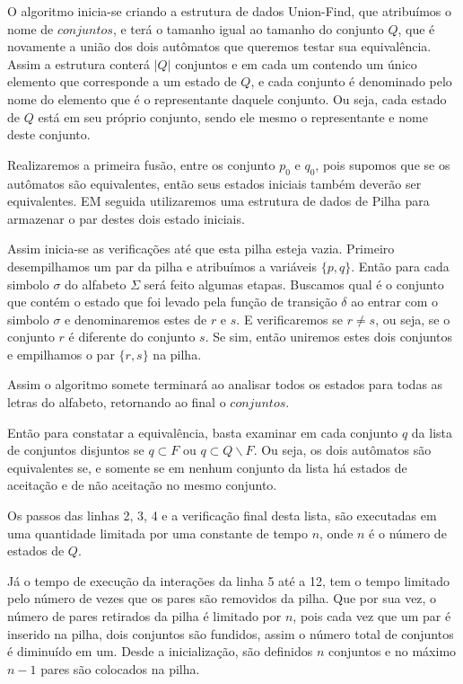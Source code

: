 \documentclass[
	12pt,				%
	openany,
	oneside,
	a4paper,			%
	english,			%
	brazil				%
	]{abntex2}
\begin{document}
  O algoritmo inicia-se criando a estrutura de dados Union-Find, que atribuímos o nome de $conjuntos$, e terá o tamanho igual ao tamanho do conjunto $Q$, que é novamente a união dos dois autômatos que queremos testar sua equivalência. Assim a estrutura conterá $|Q|$ conjuntos e em cada um contendo um único elemento que corresponde a um estado de $Q$, e cada conjunto é denominado pelo nome do elemento que é o representante daquele conjunto. Ou seja, cada estado de $Q$ está em seu próprio conjunto, sendo ele mesmo o representante e nome deste conjunto.

  Realizaremos a primeira fusão, entre os conjunto $p_0$ e $q_0$, pois supomos que se os autômatos são equivalentes, então seus estados iniciais também deverão ser equivalentes. EM seguida utilizaremos uma estrutura de dados de Pilha para armazenar o par destes dois estado iniciais.

  Assim inicia-se as verificações até que esta pilha esteja vazia. Primeiro desempilhamos um par da pilha e atribuímos a variáveis $\{p,q\}$. Então para cada simbolo $\sigma$ do alfabeto $\Sigma$ será feito algumas etapas. Buscamos qual é o conjunto que contém o estado que foi levado pela função de transição $\delta$ ao entrar com o simbolo $\sigma$ e denominaremos estes de $r$ e $s$. E verificaremos se $r \neq s$, ou seja, se o conjunto $r$ é diferente do conjunto $s$. Se sim, então uniremos estes dois conjuntos e empilhamos o par $\{r, s\}$ na pilha.

  Assim o algoritmo somete terminará ao analisar todos os estados para todas as letras do alfabeto, retornando ao final o $conjuntos$.

  Então para constatar a equivalência, basta examinar em cada conjunto $q$ da lista de conjuntos disjuntos se $q \subset F$ ou $q \subset Q \backslash F$. Ou seja, os dois autômatos são equivalentes se, e somente se em nenhum conjunto da lista há estados de aceitação e de não aceitação no mesmo conjunto.

  Os passos das linhas 2, 3, 4 e a verificação final desta lista, são executadas em uma quantidade limitada por uma constante de tempo $n$, onde $n$ é o número de estados de $Q$.

 Já o tempo de execução da interações da linha 5 até a 12, tem o tempo limitado pelo número de vezes que os pares são removidos da pilha. Que por sua vez, o número de pares retirados da pilha é limitado por $n$, pois cada vez que um par é inserido na pilha, dois conjuntos são fundidos, assim o número total de conjuntos é diminuído em um. Desde a inicialização, são definidos $n$ conjuntos e no máximo $n-1$ pares são colocados na pilha.
\end{document}
